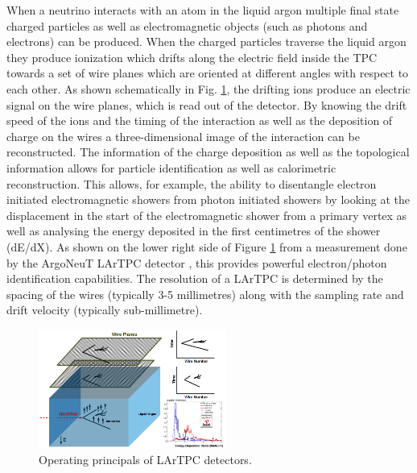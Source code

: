 When a neutrino interacts with an atom in the liquid argon multiple final state charged particles as well as electromagnetic objects (such as photons and electrons) can be produced. When the charged particles traverse the liquid argon they produce ionization which drifts along the electric field inside the TPC towards a set of wire planes which are oriented at different angles with respect to each other. As shown schematically in Fig. \ref{fig:LArTPC}, the drifting ions produce an electric signal on the wire planes, which is read out of the detector. By knowing the drift speed of the ions and the timing of the interaction as well as the deposition of charge on the wires a three-dimensional image of the interaction can be reconstructed. The information of the charge deposition as well as the topological information allows for particle identification as well as calorimetric reconstruction. This allows, for example, the ability to disentangle electron initiated electromagnetic showers from photon initiated showers by looking at the displacement in the start of the electromagnetic shower from a primary vertex as well as analysing the energy deposited in the first centimetres of the shower (dE/dX). As shown on the lower right side of Figure \ref{fig:LArTPC} from a measurement done by the ArgoNeuT LArTPC detector \cite{Argoneut}, this provides powerful electron/photon identification capabilities. The resolution of a LArTPC is determined by the spacing of the wires (typically 3-5 millimetres) along with the sampling rate and drift velocity (typically sub-millimetre).

\begin{figure}[htb]
\centering
\includegraphics[width=0.55\textwidth]{images/lartpc.png}
\caption[]{Operating principals of LArTPC detectors.}
\label{fig:LArTPC}
\end{figure}

